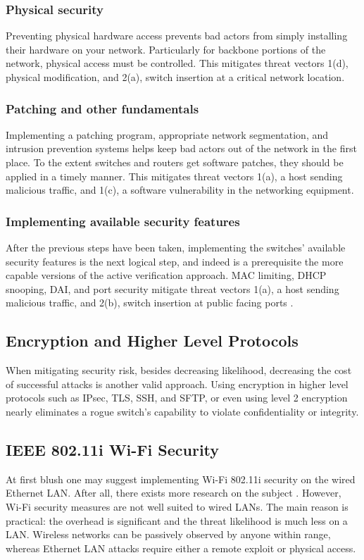 \documentclass[journal]{IEEEtran}
\begin{document}
\subsubsection{Physical security}
Preventing physical hardware access prevents bad actors from simply installing their hardware on
your network. Particularly for backbone portions of the network, physical access must be controlled.
This mitigates threat vectors 1(d), physical modification, and 2(a), switch insertion at a
critical network location.

\subsubsection{Patching and other fundamentals}
Implementing a patching program, appropriate network segmentation, and intrusion prevention systems
helps keep bad actors out of the network in the first place. To the extent switches and routers get
software patches, they should be applied in a timely manner. This mitigates threat vectors 1(a), a
host sending malicious traffic, and 1(c), a software vulnerability in the networking equipment.

\subsubsection{Implementing available security features}
After the previous steps have been taken, implementing the switches' available security features is
the next logical step, and indeed is a prerequisite the more capable versions of the active
verification approach. MAC limiting, DHCP snooping, DAI, and port security mitigate threat vectors
1(a), a host sending malicious traffic, and 2(b), switch insertion at public facing ports \cite{b1}.


\subsection{Encryption and Higher Level Protocols}
When mitigating security risk, besides decreasing likelihood, decreasing the cost of successful
attacks is another valid approach. Using encryption in higher level protocols such as IPsec, TLS,
SSH, and SFTP, or even using level 2 encryption \cite{b3} nearly eliminates a rogue switch's
capability to violate confidentiality or integrity.


\subsection{IEEE 802.11i Wi-Fi Security}
At first blush one may suggest implementing Wi-Fi 802.11i security on the wired Ethernet LAN. After
all, there exists more research on the subject \cite{b4}\cite{b5}. However, Wi-Fi security measures
are not well suited to wired LANs. The main reason is practical: the overhead is significant and
the threat likelihood is much less on a LAN. Wireless networks can be passively observed by anyone
within range, whereas Ethernet LAN attacks require either a remote exploit or physical access.
\end{document}
